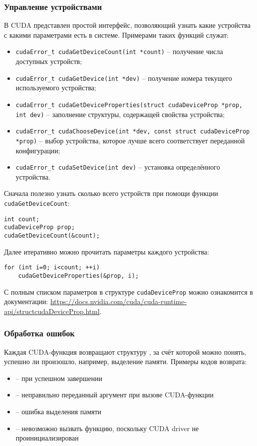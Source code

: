 \subsubsection*{Управление устройствами}
В CUDA представлен простой интерфейс, позволяющий узнать какие устройства с какими параметрами есть в системе. Примерами таких функций служат:
\begin{itemize}
    \sloppy
    \item\texttt{cudaError\_t cudaGetDeviceCount(int *count)} -- получение числа доступных устройств;
    \item\texttt{cudaError\_t cudaGetDevice(int *dev)} -- получение номера текущего используемого устройства;
    \item\texttt{cudaError\_t cudaGetDeviceProperties(struct cudaDeviceProp *prop, int dev)} -- заполнение структуры, содержащей свойства устройства;
    \item\texttt{cudaError\_t cudaChooseDevice(int *dev, const struct cudaDeviceProp *prop)} -- выбор устройства, которое лучше всего соответствует переданной конфигурации;
    \item\texttt{cudaError\_t cudaSetDevice(int dev)} -- установка определённого устройства.
\end{itemize}

Сначала полезно узнать сколько всего устройств при помощи функции \texttt{cudaGetDeviceCount}:
\begin{verbatim}
int count;
cudaDeviceProp prop; 
cudaGetDeviceCount(&count);
\end{verbatim}

Далее итеративно можно прочитать параметры каждого устройства:
\begin{verbatim}
for (int i=0; i<count; ++i)
    cudaGetDeviceProperties(&prop, i);
\end{verbatim}

С полным списком параметров в структуре \texttt{cudaDeviceProp} можно ознакомится в документации: \url{https://docs.nvidia.com/cuda/cuda-runtime-api/structcudaDeviceProp.html}.

\subsubsection*{Обработка ошибок}
Каждая CUDA-функция возвращают структуру , за счёт которой можно понять, успешно ли произошло, например, выделение памяти. Примеры кодов возврата:
\begin{itemize}
    \item{} -- при успешном завершении
    \item{} -- неправильно переданный аргумент при вызове CUDA-функции
    \item{} -- ошибка выделения памяти
    \item{} -- невозможно вызвать функцию, поскольку CUDA driver не проинициализирован
\end{itemize}

